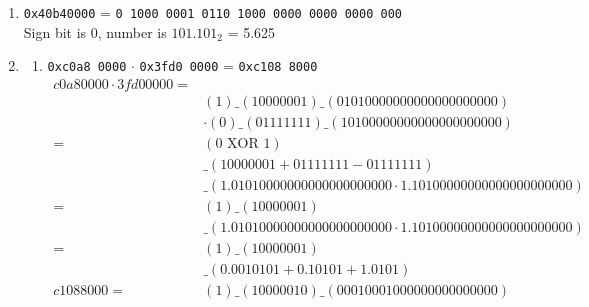 \documentclass{article}
\begin{document}
\begin{enumerate}
	\item \texttt{0x40b40000} = \texttt{0 1000 0001 0110 1000 0000 0000 0000 000} \\
	      Sign bit is 0, number is $101.101_2$ = 5.625

	\item
	      \begin{enumerate}
		      \item \texttt{0xc0a8 0000} $\cdot$ \texttt{0x3fd0 0000} = \texttt{0xc108 8000}
		            \begin{align*}
			            c0a80000 \cdot 3fd00000 = &                                                                                        \\
			                                      & \left(1\right)\_\left(10000001\right)\_\left(01010000000000000000000\right)            \\
			                                      & \cdot \left(0\right)\_\left(01111111\right)\_\left(10100000000000000000000\right)      \\
			            =                         & \left(0 \text{ XOR } 1\right)                                                          \\
			                                      & \_\left(10000001+01111111-01111111\right)                                              \\
			                                      & \_\left(1.01010000000000000000000 \cdot 1.10100000000000000000000\right)               \\
			            =                         & \left(1\right) \_ \left(10000001\right)                                                \\
			                                      & \_\left(1.01010000000000000000000 \cdot 1.10100000000000000000000\right)               \\
			            =                         & \left(1\right) \_ \left(10000001\right)                                                \\
			                                      & \_\left(0.0010101 + 0.10101 + 1.0101\right)                                            \\
			            c108 8000=                & \left(1\right) \_ \left(100 0001 0\right) \_ \left(000 1000 1000 0000 0000 0000\right)
		            \end{align*}


\end{enumerate}
\end{enumerate}
\end{document}
